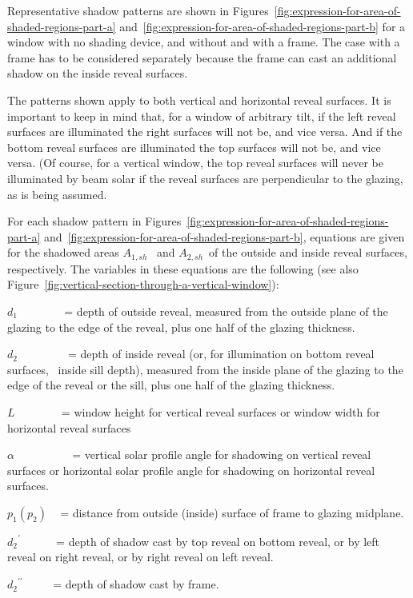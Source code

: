 Representative shadow patterns are shown in Figures~\ref{fig:expression-for-area-of-shaded-regions-part-a} and~\ref{fig:expression-for-area-of-shaded-regions-part-b} for a window with no shading device, and without and with a frame. The case with a frame has to be considered separately because the frame can cast an additional shadow on the inside reveal surfaces.

The patterns shown apply to both vertical and horizontal reveal surfaces. It is important to keep in mind that, for a window of arbitrary tilt, if the left reveal surfaces are illuminated the right surfaces will not be, and vice versa. And if the bottom reveal surfaces are illuminated the top surfaces will not be, and vice versa. (Of course, for a vertical window, the top reveal surfaces will never be illuminated by beam solar if the reveal surfaces are perpendicular to the glazing, as is being assumed.

For each shadow pattern in Figures~\ref{fig:expression-for-area-of-shaded-regions-part-a} and~\ref{fig:expression-for-area-of-shaded-regions-part-b}, equations are given for the shadowed areas \({A_{1,sh}}\) ~and \emph{\({A_{2,sh}}\)}~of the outside and inside reveal surfaces, respectively. The variables in these equations are the following (see also Figure~\ref{fig:vertical-section-through-a-vertical-window}):

\({d_1}\) ~~~~~~~ = depth of outside reveal, measured from the outside plane of the glazing to the edge of the reveal, plus one half of the glazing thickness.

\({d_2}\) ~~ ~~~~~ = depth of inside reveal (or, for illumination on bottom reveal surfaces,~ inside sill depth), measured from the inside plane of the glazing to the edge of the reveal or the sill, plus one half of the glazing thickness.

\(L\) ~~~~~~~ = window height for vertical reveal surfaces or window width for horizontal reveal surfaces

\(\alpha\) ~~~~~~~~~ = vertical solar profile angle for shadowing on vertical reveal surfaces or horizontal solar profile angle for shadowing on horizontal reveal surfaces.

\({p_1}({p_2})\) ~ = distance from outside (inside) surface of frame to glazing midplane.

\({d_2}^\prime\) ~~~~~ = depth of shadow cast by top reveal on bottom reveal, or by left reveal on right reveal, or by right reveal on left reveal.

\({d_2}^{\prime \prime }\) ~~~~ = depth of shadow cast by frame.

